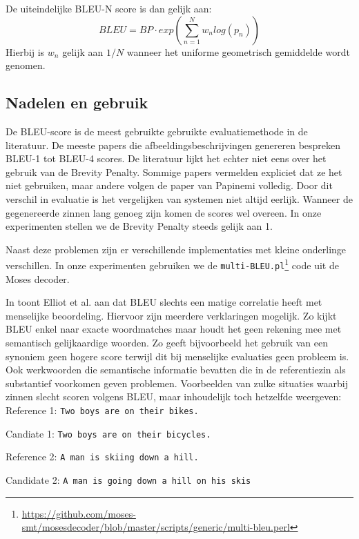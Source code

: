 De uiteindelijke BLEU-N score is dan gelijk aan:
\begin{equation}
BLEU = BP\cdot exp(\sum\limits_{n=1}^N w_nlog(p_n))
\end{equation}
Hierbij is $w_n$ gelijk aan $1/N$ wanneer het uniforme geometrisch gemiddelde wordt genomen.

\subsection{Nadelen en gebruik}
De BLEU-score is de meest gebruikte gebruikte evaluatiemethode in de literatuur. De meeste papers die afbeeldingsbeschrijvingen genereren bespreken BLEU-1 tot BLEU-4 scores. De literatuur lijkt het echter niet eens over het gebruik van de Brevity Penalty. Sommige papers vermelden expliciet dat ze het niet gebruiken, maar andere volgen de paper van Papinemi volledig. Door dit verschil in evaluatie is het vergelijken van systemen niet altijd eerlijk. Wanneer de gegenereerde zinnen lang genoeg zijn komen de scores wel overeen.
In onze experimenten stellen we de Brevity Penalty steeds gelijk aan 1.

Naast deze problemen zijn er verschillende implementaties met kleine onderlinge verschillen. In onze experimenten gebruiken we de \texttt{multi-BLEU.pl}\footnote{\url{https://github.com/moses-smt/mosesdecoder/blob/master/scripts/generic/multi-bleu.perl}} code uit de Moses decoder.

In  toont Elliot et al. aan dat BLEU slechts een matige correlatie heeft met menselijke beoordeling.
Hiervoor zijn meerdere verklaringen mogelijk. Zo kijkt BLEU enkel naar exacte woordmatches maar houdt het geen rekening mee met semantisch gelijkaardige woorden. Zo geeft bijvoorbeeld het gebruik van een synoniem geen hogere score terwijl dit bij menselijke evaluaties geen probleem is. Ook werkwoorden die semantische informatie bevatten die in de referentiezin als substantief voorkomen geven problemen. Voorbeelden van zulke situaties waarbij zinnen slecht scoren volgens BLEU, maar inhoudelijk toch hetzelfde weergeven:
\\

Reference 1: \texttt{Two boys are on their bikes.}

Candiate 1: \texttt{Two boys are on their bicycles.}

Reference 2: \texttt{A man is skiing down a hill.}

Candidate 2: \texttt{A man is going down a hill on his skis}
\\

